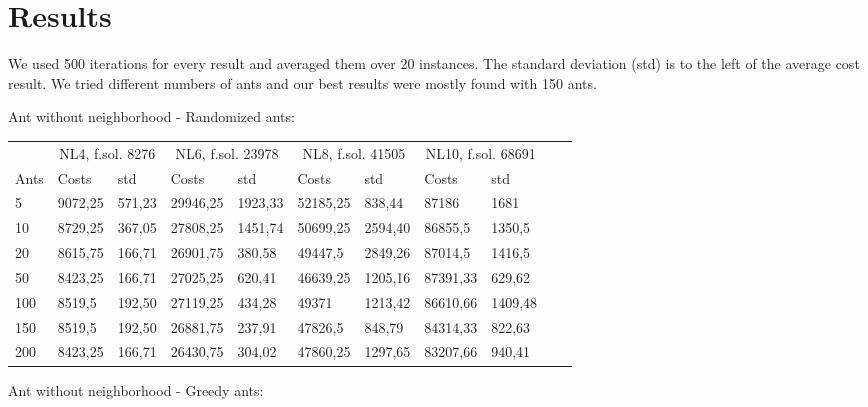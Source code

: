\section{Results}

We used 500 iterations for every result and averaged them over 20 instances. The
standard deviation (std) is to the left of the average cost result. We tried
different numbers of ants and our best results were mostly found with 150 ants.

Ant without neighborhood - Randomized ants:
\newline
\begin{minipage}[b]{1.0\textwidth}
    \begin{tabular}{ l | ll | ll | ll | ll | ll}
	\hline
	& \multicolumn{2}{c}{NL4, f.sol. 8276} & \multicolumn{2}{c}{NL6, f.sol. 23978}
	& \multicolumn{2}{c}{NL8, f.sol. 41505} & \multicolumn{2}{c}{NL10, f.sol. 68691} \\
	\cline{1-9}
	Ants & Costs & std & Costs & std & Costs & std & Costs & std \\
	\hline
	5     &  9072,25    & 571,23 &  29946,25    & 1923,33 &  52185,25   & 838,44 &  87186    & 1681 \\
	10    &  8729,25    & 367,05 &  27808,25    & 1451,74 &  50699,25   & 2594,40 &  86855,5    & 1350,5 \\
	20    &  8615,75    & 166,71 &  26901,75    & 380,58 &  49447,5    & 2849,26 &  87014,5    & 1416,5 \\
	50    &  8423,25    & 166,71 &  27025,25    & 620,41 &  46639,25   & 1205,16 &  87391,33    & 629,62 \\
	100   &  8519,5    & 192,50 &  27119,25    & 434,28 &  49371      & 1213,42 &  86610,66    & 1409,48 \\
	150   &  8519,5    & 192,50 &  26881,75    & 237,91 &  47826,5    & 848,79 &  84314,33    & 822,63 \\
	200   &  8423,25    & 166,71 &  26430,75    & 304,02 &  47860,25   & 1297,65 &  83207,66    & 940,41 \\
	\hline
	\end{tabular}
\end{minipage}
\newline
Ant without neighborhood - Greedy ants:
\newline
